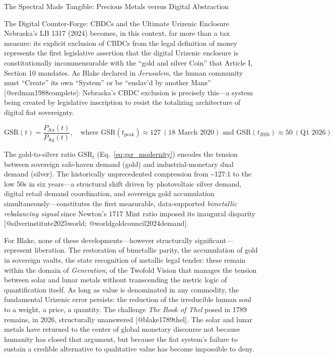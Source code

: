 \documentclass[
  ignorenonframetext,
]{beamer}
\begin{document}
\begin{frame}{The Spectral Made Tangible: Precious Metals versus Digital
Abstraction}
\begin{block}{The Digital Counter-Forge: CBDCs and the Ultimate Urizenic
Enclosure}
Nebraska's LB 1317 (2024) becomes, in this context, far more than a tax
measure: its explicit exclusion of CBDCs from the legal definition of
money represents the first legislative assertion that the digital
Urizenic enclosure is constitutionally incommensurable with the ``gold
and silver Coin'' that Article I, Section 10 mandates. As Blake declared
in \emph{Jerusalem}, the human community must ``Create'' its own
``System'' or be ``enslav'd by another Mans'' {[}@erdman1988complete{]}:
Nebraska's CBDC exclusion is precisely this---a system being created by
legislative inscription to resist the totalizing architecture of digital
fiat sovereignty.

\begin{equation}
\label{eq:gsr_modernity}
\mathrm{GSR}(t) = \frac{P_{\mathrm{Au}}(t)}{P_{\mathrm{Ag}}(t)}, \quad
\text{where } \mathrm{GSR}(t_{\mathrm{peak}}) \approx 127\ (\text{18 March 2020})
\text{ and } \mathrm{GSR}(t_{\mathrm{2026}}) \approx 50\ (\text{Q1 2026})
\end{equation}

The gold-to-silver ratio \(\mathrm{GSR}_t\) (Eq.~\ref{eq:gsr_modernity})
encodes the tension between sovereign safe-haven demand (gold) and
industrial-monetary dual demand (silver). The historically unprecedented
compression from \textasciitilde127:1 to the low 50s in six years---a
structural shift driven by photovoltaic silver demand, digital retail
demand coordination, and sovereign gold accumulation
simultaneously---constitutes the first measurable, data-supported
\emph{bimetallic rebalancing signal} since Newton's 1717 Mint ratio
imposed its inaugural disparity {[}@silverinstitute2025world;
@worldgoldcouncil2024demand{]}.

For Blake, none of these developments---however structurally
significant---represent liberation. The restoration of bimetallic
parity, the accumulation of gold in sovereign vaults, the state
recognition of metallic legal tender: these remain within the domain of
\emph{Generation}, of the Twofold Vision that manages the tension
between solar and lunar metals without transcending the metric logic of
quantification itself. As long as value is denominated in any commodity,
the fundamental Urizenic error persists: the reduction of the
irreducible human soul to a weight, a price, a quantity. The challenge
\emph{The Book of Thel} posed in 1789 remains, in 2026, structurally
unanswered {[}@blake1789thel{]}. The solar and lunar metals have
returned to the center of global monetary discourse not because humanity
has closed that argument, but because the fiat system's failure to
sustain a credible alternative to qualitative value has become
impossible to deny.


\end{block}
\end{frame}
\end{document}
